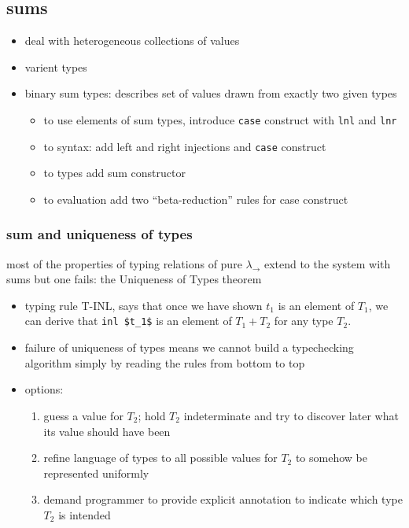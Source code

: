 \documentclass[11pt]{article}
\begin{document}
\subsection{sums}
\label{sec:orgedda38a}
\begin{itemize}
\item deal with heterogeneous collections of values
\item varient types
\item binary sum types: describes set of values drawn from exactly two given types
\begin{itemize}
\item to use elements of sum types, introduce \texttt{case} construct with \texttt{lnl} and \texttt{lnr}
\item to syntax: add left and right injections and \texttt{case} construct
\item to types add sum constructor
\item to evaluation add two ``beta-reduction'' rules for case construct
\end{itemize}
\end{itemize}

\subsubsection{sum and uniqueness of types}
\label{sec:org4a3c66d}
most of the properties of typing relations of pure \(\lambda_{\rightarrow}\) extend to the system with sums but one fails: the Uniqueness of Types theorem
\begin{itemize}
\item typing rule T-INL, says that once we have shown \(t_1\) is an element of \(T_1\), we can derive that \texttt{inl \$t\_1\$} is an element of \(T_1+T_2\) for any type \(T_2\).
\item failure of uniqueness of types means we cannot build a typechecking algorithm simply by reading the rules from bottom to top
\item options:
\begin{enumerate}
\item guess a value for \(T_2\); hold \(T_2\) indeterminate and try to discover later what its value should have been
\item refine language of types to all possible values for \(T_2\) to somehow be represented uniformly
\item demand programmer to provide explicit annotation to indicate which type \(T_2\) is intended
\end{enumerate}
\end{itemize}
\end{document}

